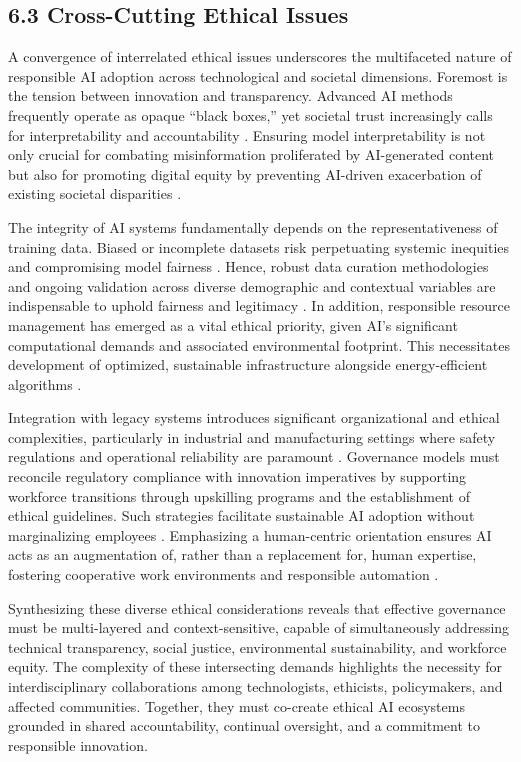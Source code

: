 \documentclass[11pt]{article}
\begin{document}
\subsection{6.3 Cross-Cutting Ethical Issues}

A convergence of interrelated ethical issues underscores the multifaceted nature of responsible AI adoption across technological and societal dimensions. Foremost is the tension between innovation and transparency. Advanced AI methods frequently operate as opaque “black boxes,” yet societal trust increasingly calls for interpretability and accountability \cite{ref7,ref8}. Ensuring model interpretability is not only crucial for combating misinformation proliferated by AI-generated content but also for promoting digital equity by preventing AI-driven exacerbation of existing societal disparities \cite{ref6,ref17}.

The integrity of AI systems fundamentally depends on the representativeness of training data. Biased or incomplete datasets risk perpetuating systemic inequities and compromising model fairness \cite{ref37}. Hence, robust data curation methodologies and ongoing validation across diverse demographic and contextual variables are indispensable to uphold fairness and legitimacy \cite{ref20}. In addition, responsible resource management has emerged as a vital ethical priority, given AI’s significant computational demands and associated environmental footprint. This necessitates development of optimized, sustainable infrastructure alongside energy-efficient algorithms \cite{ref19}.

Integration with legacy systems introduces significant organizational and ethical complexities, particularly in industrial and manufacturing settings where safety regulations and operational reliability are paramount \cite{ref38}. Governance models must reconcile regulatory compliance with innovation imperatives by supporting workforce transitions through upskilling programs and the establishment of ethical guidelines. Such strategies facilitate sustainable AI adoption without marginalizing employees \cite{ref11,ref12}. Emphasizing a human-centric orientation ensures AI acts as an augmentation of, rather than a replacement for, human expertise, fostering cooperative work environments and responsible automation \cite{ref2}.

Synthesizing these diverse ethical considerations reveals that effective governance must be multi-layered and context-sensitive, capable of simultaneously addressing technical transparency, social justice, environmental sustainability, and workforce equity. The complexity of these intersecting demands highlights the necessity for interdisciplinary collaborations among technologists, ethicists, policymakers, and affected communities. Together, they must co-create ethical AI ecosystems grounded in shared accountability, continual oversight, and a commitment to responsible innovation.
\end{document}

